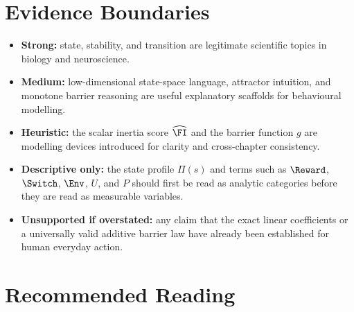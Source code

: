 \section{Evidence Boundaries}

\begin{itemize}[nosep]
  \item \textbf{Strong:} state, stability, and transition are legitimate
        scientific topics in biology and neuroscience.
  \item \textbf{Medium:} low-dimensional state-space language, attractor
        intuition, and monotone barrier reasoning are useful explanatory
        scaffolds for behavioural modelling.
  \item \textbf{Heuristic:} the scalar inertia score $\widehat{\FI}$ and the
        barrier function $g$ are modelling devices introduced for clarity and
        cross-chapter consistency.
  \item \textbf{Descriptive only:} the state profile $\Pi(s)$ and terms such as
        $\Reward$, $\Switch$, $\Env$, $U$, and $P$ should first be read as
        analytic categories before they are read as measurable variables.
  \item \textbf{Unsupported if overstated:} any claim that the exact linear
        coefficients or a universally valid additive barrier law have already
        been established for human everyday action.
\end{itemize}

\section{Recommended Reading}

